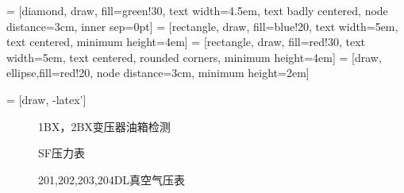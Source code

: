 \documentclass{article}
\begin{document}
\pagestyle{empty}

 = [diamond, draw, fill=green!30, 
    text width=4.5em, text badly centered, node distance=3cm, inner sep=0pt]
 = [rectangle, draw, fill=blue!20, 
    text width=5em, text centered, minimum height=4em]
 = [rectangle, draw, fill=red!30, 
    text width=5em, text centered, rounded corners, minimum height=4em]
 = [draw, ellipse,fill=red!20, node distance=3cm,
    minimum height=2em]

 = [draw, -latex']    
    
\begin{figure}[htb]
    \centering
    
    \caption{1BX，2BX变压器油箱检测}
    \label{fig:1bx2bx}
\end{figure}

\begin{figure}[htb]
    \centering
    
    \caption{SF压力表}
    \label{fig:sf}
\end{figure}


\begin{figure}[htb]
    \centering
    
    \caption{201,202,203,204DL真空气压表}
    \label{fig:dl201202203204}
\end{figure}
\end{document}
